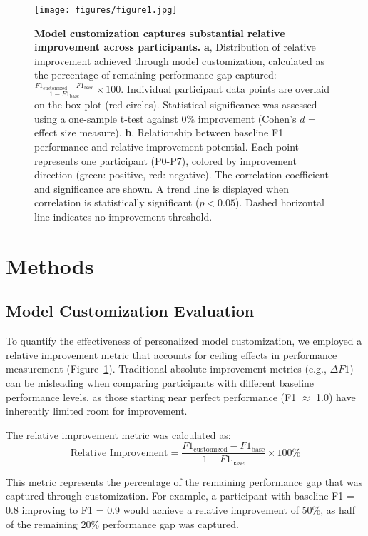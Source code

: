 \documentclass[11pt]{article}
\begin{document}
\begin{figure}[htbp]
    \centering
    \texttt{[image: figures/figure1.jpg]}
    \caption{\textbf{Model customization captures substantial relative improvement across participants.}
    \textbf{a}, Distribution of relative improvement achieved through model customization, calculated as the percentage of remaining performance gap captured: $\frac{F1_{\text{customized}} - F1_{\text{base}}}{1 - F1_{\text{base}}} \times 100$. Individual participant data points are overlaid on the box plot (red circles). Statistical significance was assessed using a one-sample t-test against 0\% improvement (Cohen's $d$ = effect size measure).
    \textbf{b}, Relationship between baseline F1 performance and relative improvement potential. Each point represents one participant (P0-P7), colored by improvement direction (green: positive, red: negative). The correlation coefficient and significance are shown. A trend line is displayed when correlation is statistically significant ($p < 0.05$). Dashed horizontal line indicates no improvement threshold.}
    \label{fig:relative_improvement}
\end{figure}

\section{Methods}

\subsection{Model Customization Evaluation}

To quantify the effectiveness of personalized model customization, we employed a relative improvement metric that accounts for ceiling effects in performance measurement (Figure~\ref{fig:relative_improvement}). Traditional absolute improvement metrics (e.g., $\Delta F1$) can be misleading when comparing participants with different baseline performance levels, as those starting near perfect performance (F1 $\approx$ 1.0) have inherently limited room for improvement.

The relative improvement metric was calculated as:
\begin{equation}
\text{Relative Improvement} = \frac{F1_{\text{customized}} - F1_{\text{base}}}{1 - F1_{\text{base}}} \times 100\%
\end{equation}

This metric represents the percentage of the remaining performance gap that was captured through customization. For example, a participant with baseline F1 = 0.8 improving to F1 = 0.9 would achieve a relative improvement of 50\%, as half of the remaining 20\% performance gap was captured.
\end{document}
